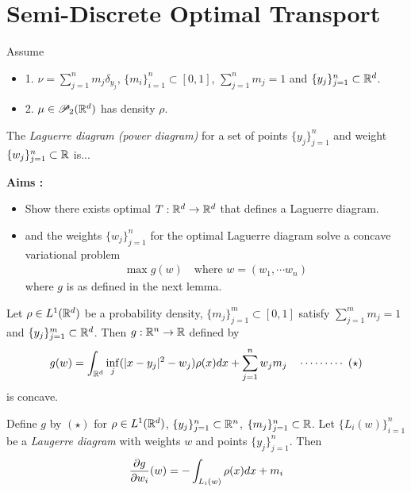 \documentclass[10pt,a4paper]{article}
\renewenvironment{i}
{\begin{itemize} 
	}%
	{\end{itemize}
}
\begin{document}
\section{Semi-Discrete Optimal Transport}

Assume
\begin{i}
\item[1.] $\nu = \sum_{j=1}^n m_{j} \delta_{y_j}$, $\{m_i\}_{i=1}^n \subset [0,1]$, $\sum_{j=1}^n m_j =1$ and $\{y_j \}_{j=1}^n \subset \mathbb{R}^d$.
\item[2.] $\mu \in \mathscr{P}_2(\mathbb{R}^d)$ has density $\rho$.  
\end{i}
\s

 The \emph{Laguerre diagram (power diagram)} for a set of points $\{y_j\}_{j=1}^n$ and weight $\{w_j\}_{j=1}^n\subset \mathbb{R}$ is...
\s

\textbf{Aims :}
\begin{i}
\item Show there exists optimal $T: \mathbb{R}^d \rightarrow \mathbb{R}^d$ that defines a Laguerre diagram.
\item and the weights $\{w_j\}_{j=1}^n$ for the optimal Laguerre diagram solve a concave variational problem
\begin{align*}
\max g(w) \quad \text{where } w= (w_1, \cdots w_n)
\end{align*} 
where $g$ is as defined in the next lemma.
\end{i}
\s

 Let $\rho \in L^1(\mathbb{R}^d)$ be a probability density, $\{m_j \}_{j=1}^m \subset [0,1]$ satisfy $\sum_{j=1}^m m_j =1$ and $\{y_j \}_{j=1}^m \subset \mathbb{R}^d$. Then $g: \mathbb{R}^n \rightarrow \mathbb{R}$ defined by 
\begin{align*}
g(w) = \int_{\mathbb{R}^d} \inf_j (|x-y_j|^2 - w_j) \rho(x) dx + \sum_{j=1}^n w_j m_j \quad \cdots\cdots\cdots\,\,(\star)
\end{align*}
is concave.
\s

 Define $g$ by $(\star)$ for $\rho \in L^1(\mathbb{R}^d)$, $\{y_j \}_{j=1}^n \subset \mathbb{R}^n$, $\{m_j \}_{j=1}^n \subset \mathbb{R}$. Let $\{L_i(w)\}_{i=1}^n$ be a \emph{Laugerre diagram} with weights $w$ and points $\{y_j \}_{j=1}^n$. Then
\begin{align*}
\frac{\partial g}{\partial w_i}(w) = -\int_{L_i(w)} \rho(x) dx + m_i
\end{align*}
\s
\end{document}
